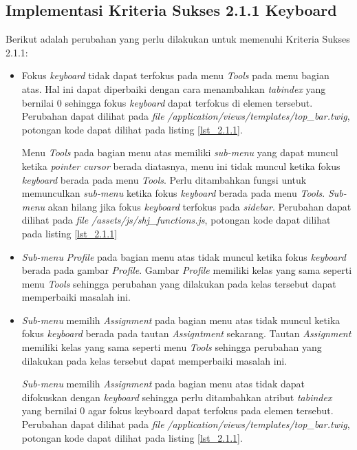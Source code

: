 \subsection{Implementasi Kriteria Sukses 2.1.1 Keyboard}
\label{subsec:implementasi_A_2.1.1}
Berikut adalah perubahan yang perlu dilakukan untuk memenuhi Kriteria Sukses 2.1.1:

\begin{itemize}
	\item Fokus \textit{keyboard} tidak dapat terfokus pada menu \textit{Tools} pada menu bagian atas. Hal ini dapat diperbaiki dengan cara menambahkan \textit{tabindex} yang bernilai 0 sehingga fokus \textit{keyboard} dapat terfokus di elemen tersebut. Perubahan dapat dilihat pada \textit{file} \textit{/application/views/templates/top\_bar.twig}, potongan kode dapat dilihat pada listing \ref{lst_2.1.1}.
	
	Menu \textit{Tools} pada bagian menu atas memiliki \textit{sub-menu} yang dapat muncul ketika \textit{pointer cursor} berada diatasnya, menu ini tidak muncul ketika fokus \textit{keyboard} berada pada menu \textit{Tools}. Perlu ditambahkan fungsi untuk memunculkan \textit{sub-menu} ketika fokus \textit{keyboard} berada pada menu \textit{Tools}. \textit{Sub-menu} akan hilang jika fokus \textit{keyboard} terfokus pada \textit{sidebar}. Perubahan dapat dilihat pada \textit{file} \textit{/assets/js/shj\_functions.js}, potongan kode dapat dilihat pada listing \ref{lst_2.1.1}

	\item \textit{Sub-menu} \textit{Profile} pada bagian menu atas tidak muncul ketika fokus \textit{keyboard} berada pada gambar \textit{Profile}. Gambar \textit{Profile} memiliki kelas yang sama seperti menu \textit{Tools} sehingga perubahan yang dilakukan pada kelas tersebut dapat memperbaiki masalah ini.
	
	\item \textit{Sub-menu} memilih \textit{Assignment} pada bagian menu atas tidak muncul ketika fokus \textit{keyboard} berada pada tautan \textit{Assigntment} sekarang. Tautan \textit{Assignment} memiliki kelas yang sama seperti menu \textit{Tools} sehingga perubahan yang dilakukan pada kelas tersebut dapat memperbaiki masalah ini.
	
	\textit{Sub-menu} memilih \textit{Assignment} pada bagian menu atas tidak dapat difokuskan dengan \textit{keyboard} sehingga perlu ditambahkan atribut \textit{tabindex} yang bernilai 0 agar fokus keyboard dapat terfokus pada elemen tersebut. Perubahan dapat dilihat pada \textit{file} \textit{/application/views/templates/top\_bar.twig}, potongan kode dapat dilihat pada listing \ref{lst_2.1.1}.


\end{itemize}
